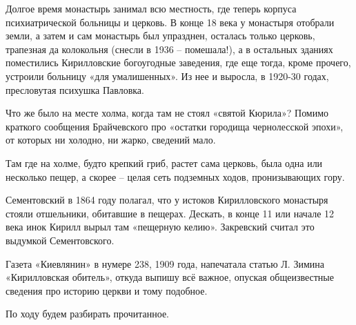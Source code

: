 
Долгое время монастырь занимал всю местность, где теперь корпуса психиатрической больницы и церковь. В конце 18 века у монастыря отобрали земли, а затем и сам монастырь был упразднен, осталась только церковь, трапезная да колокольня (снесли в 1936 – помешала!), а в остальных зданиях поместились Кирилловские богоугодные заведения, где еще тогда, кроме прочего, устроили больницу «для умалишенных». Из нее и выросла, в 1920-30 годах, пресловутая психушка Павловка. 

Что же было на месте холма, когда там не стоял «святой Кюрила»? Помимо краткого сообщения Брайчевского про «остатки городища чернолесской эпохи», от которых ни холодно, ни жарко, сведений мало.

Там где на холме, будто крепкий гриб, растет сама церковь, была одна или несколько пещер, а скорее – целая сеть подземных ходов, пронизывающих гору.

Сементовский в 1864 году полагал, что у истоков Кирилловского монастыря стояли отшельники, обитавшие в пещерах. Дескать, в конце 11 или начале 12 века инок Кирилл вырыл там «пещерную келию». Закревский считал это выдумкой Сементовского.


Газета «Киевлянин» в нумере 238, 1909 года, напечатала статью Л. Зимина «Кирилловская обитель», откуда выпишу всё важное, опуская общеизвестные сведения про историю церкви и тому подобное.

По ходу будем разбирать прочитанное.

